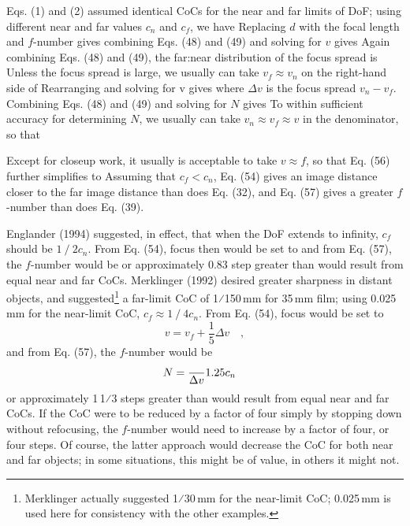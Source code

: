 \documentclass[11pt, oneside]{scrartcl}   	%
\newcommand{\Dv}{\ensuremath{\Delta v}}
\begin{document}
Eqs. (1) and (2) assumed identical CoCs for the near and far limits of DoF; using different near and far values $c_n$ and $c_f$, we have
Replacing $d$ with the focal length and $f$-number gives
combining Eqs. (48) and (49) and solving for $v$ gives
Again combining Eqs. (48) and (49), the far:near distribution of the focus spread is
Unless the focus spread is large, we usually can take $v_f \approx v_n$ on the right-hand side of
Rearranging and solving for v gives
where $Δv$ is the focus spread $v_n - v_f$. Combining Eqs. (48) and (49) and solving for $N$ gives
To within sufficient accuracy for determining $N$, we usually can take $v_n \approx v_f \approx v$ in the denominator, so that

Except for closeup work, it usually is acceptable to take $v \approx f$, so that Eq. (56) further simplifies to
Assuming that $c_f < c_n$, Eq. (54) gives an image distance closer to the far image distance than does Eq. (32), and Eq. (57) gives a greater $f$-number than does Eq. (39).

Englander (1994) suggested, in effect, that when the DoF extends to infinity, $c_f$ should be $1⁄2 c_n$. From Eq. (54), focus then would be set to
and from Eq. (57), the $f$-number would be
or approximately 0.83 step greater than would result from equal near
and far CoCs. Merklinger (1992) desired greater sharpness in distant
objects, and suggested\footnote{Merklinger actually suggested 1⁄30\,mm
  for the near-limit CoC; 0.025\,mm is used here for consistency with
  the other examples.} a far-limit CoC of 1⁄150\,mm for 35\,mm film;
using 0.025\,mm for the near-limit CoC, $c_f \approx 1⁄4 c_n$. From
Eq. (54), focus would be set to
\begin{equation}
  \label{eq:57+++}
  v=v_f+\frac15\Dv\quad,
\end{equation}
and from Eq. (57), the $f$-number would be
\begin{equation}
  \label{eq:57++++}
  N=\frac \Dv{1.25c_n}\quad
\end{equation}
or approximately 1\,1⁄3 steps greater than would result from equal near and far CoCs. If the CoC were to be reduced by a factor of four simply by stopping down without refocusing, the $f$-number would need to increase by a factor of four, or four steps. Of course, the latter approach would decrease the CoC for both near and far objects; in some situations, this might be of value, in others it might not.
\end{document}
